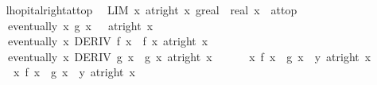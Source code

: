 \begin{isabellebody}
\ \ \isamarkupfalse%
\isanewline
{}\isamarkupfalse%
%
\endisatagproof
{\isafoldproof}%
%
\isadelimproof
\isanewline
%
\endisadelimproof
\isanewline
{}\isamarkupfalse%
\ lhopital{\isacharunderscore}{\kern0pt}right{\isacharunderscore}{\kern0pt}at{\isacharunderscore}{\kern0pt}top{\isacharcolon}{\kern0pt}\isanewline
\ \ {\isachardoublequoteopen}LIM\ x\ at{\isacharunderscore}{\kern0pt}right\ x{\isachardot}{\kern0pt}\ {\isacharparenleft}{\kern0pt}g{\isacharcolon}{\kern0pt}{\isacharcolon}{\kern0pt}real\ {\isasymRightarrow}\ real{\isacharparenright}{\kern0pt}\ x\ {\isacharcolon}{\kern0pt}{\isachargreater}{\kern0pt}\ at{\isacharunderscore}{\kern0pt}top\ {\isasymLongrightarrow}\isanewline
\ \ \ \ eventually\ {\isacharparenleft}{\kern0pt}{\isasymlambda}x{\isachardot}{\kern0pt}\ g{\isacharprime}{\kern0pt}\ x\ {\isasymnoteq}\ {}{\isacharparenright}{\kern0pt}\ {\isacharparenleft}{\kern0pt}at{\isacharunderscore}{\kern0pt}right\ x{\isacharparenright}{\kern0pt}\ {\isasymLongrightarrow}\isanewline
\ \ \ \ eventually\ {\isacharparenleft}{\kern0pt}{\isasymlambda}x{\isachardot}{\kern0pt}\ DERIV\ f\ x\ {\isacharcolon}{\kern0pt}{\isachargreater}{\kern0pt}\ f{\isacharprime}{\kern0pt}\ x{\isacharparenright}{\kern0pt}\ {\isacharparenleft}{\kern0pt}at{\isacharunderscore}{\kern0pt}right\ x{\isacharparenright}{\kern0pt}\ {\isasymLongrightarrow}\isanewline
\ \ \ \ eventually\ {\isacharparenleft}{\kern0pt}{\isasymlambda}x{\isachardot}{\kern0pt}\ DERIV\ g\ x\ {\isacharcolon}{\kern0pt}{\isachargreater}{\kern0pt}\ g{\isacharprime}{\kern0pt}\ x{\isacharparenright}{\kern0pt}\ {\isacharparenleft}{\kern0pt}at{\isacharunderscore}{\kern0pt}right\ x{\isacharparenright}{\kern0pt}\ {\isasymLongrightarrow}\isanewline
\ \ \ \ {\isacharparenleft}{\kern0pt}{\isacharparenleft}{\kern0pt}{\isasymlambda}\ x{\isachardot}{\kern0pt}\ {\isacharparenleft}{\kern0pt}f{\isacharprime}{\kern0pt}\ x\ {\isacharslash}{\kern0pt}\ g{\isacharprime}{\kern0pt}\ x{\isacharparenright}{\kern0pt}{\isacharparenright}{\kern0pt}\ {\isasymlonglongrightarrow}\ y{\isacharparenright}{\kern0pt}\ {\isacharparenleft}{\kern0pt}at{\isacharunderscore}{\kern0pt}right\ x{\isacharparenright}{\kern0pt}\ {\isasymLongrightarrow}\isanewline
\ \ \ \ {\isacharparenleft}{\kern0pt}{\isacharparenleft}{\kern0pt}{\isasymlambda}\ x{\isachardot}{\kern0pt}\ f\ x\ {\isacharslash}{\kern0pt}\ g\ x{\isacharparenright}{\kern0pt}\ {\isasymlonglongrightarrow}\ y{\isacharparenright}{\kern0pt}\ {\isacharparenleft}{\kern0pt}at{\isacharunderscore}{\kern0pt}right\ x{\isacharparenright}{\kern0pt}{\isachardoublequoteclose}\isanewline

\end{isabellebody}
